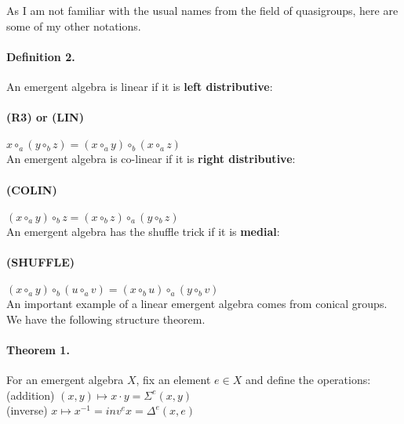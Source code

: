 \documentclass{article}
\begin{document}
As I am not familiar with the usual names from the field of quasigroups, here are some of my other notations. 


\paragraph{Definition 2.} An emergent algebra is linear if it is {\bf left distributive}:\\ 

\paragraph{ (R3) or (LIN)} $x \circ_{a} (y \circ_{b} z) = (x \circ_{a} y) \circ_{b} (x \circ_{a} z)$ \\

\noindent An emergent algebra is co-linear if it is {\bf right distributive}:\\ 

\paragraph{(COLIN)} $(x \circ_{a} y) \circ_{b} z = (x \circ_{b} z) \circ_{a} (y \circ_{b} z)$ \\

\noindent An emergent algebra has the shuffle trick if it is {\bf medial}: \\

\paragraph{(SHUFFLE)} $(x \circ_{a} y) \circ_{b} (u \circ_{a} v) = (x \circ_{b} u) \circ_{a} (y \circ_{b} v)$ \\


An important example of a linear emergent algebra comes from conical groups. We have the following structure theorem. \\

\paragraph{Theorem 1.} For an emergent algebra $X$, fix an element $e \in X$ and define the operations: \\

(addition) $(x,y) \mapsto  x \cdot y = \Sigma^{e} (x , y)$  \\

(inverse) $x \mapsto x^{-1} = inv^{e} x = \Delta^{e} (x,e)$ \\
\end{document}
